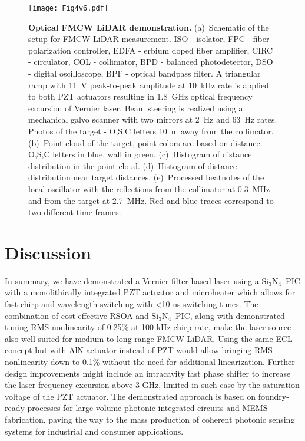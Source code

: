 \documentclass[9pt,twocolumn,twoside, superscriptaddress]{revtex4-2}
\newcommand{\SiN}[0]{Si$_3$N$_4$~}
\begin{document}
\begin{figure*}[t]
	\centering
	\footnotesize \linespread{1}
	\texttt{[image: Fig4v6.pdf]}
	\caption{
		\textbf{Optical FMCW LiDAR demonstration.}
		(a)~Schematic of the setup for FMCW LiDAR measurement. ISO - isolator, FPC - fiber polarization controller, EDFA - erbium doped fiber amplifier, CIRC - circulator, COL - collimator, BPD - balanced photodetector, DSO - digital oscilloscope, BPF - optical bandpass filter. 
		A triangular ramp with 11~V peak-to-peak amplitude at 10~kHz rate is applied to both PZT actuators resulting in 1.8~GHz optical frequency excursion of Vernier laser.
		Beam steering is realized using a mechanical galvo scanner with two mirrors at 2~Hz and 63~Hz rates.
		Photos of the target - O,S,C letters 10~m away from the collimator.
		(b)~Point cloud of the target, point colors are based on distance. O,S,C letters in blue, wall in green.
		(c)~Histogram of distance distribution in the point cloud.
		(d)~Histogram of distance distribution near target distances.
		(e)~Processed beatnotes of the local oscillator with the reflections from the collimator at 0.3~MHz and from the target at 2.7~MHz. Red and blue traces correspond to two different time frames. 
	}
	\label{Fig:Fig5}
\end{figure*}

\section{Discussion}
In summary, we have demonstrated a Vernier-filter-based laser using a \SiN PIC with a monolithically integrated PZT actuator and microheater which allows for fast chirp and wavelength switching with <10 ns switching times. 
The combination of cost-effective RSOA and \SiN PIC, along with demonstrated tuning RMS nonlinearity of 0.25\% at 100 kHz chirp rate, make the laser source also well suited for medium to long-range FMCW LiDAR.
Using the same ECL concept but with AlN actuator instead of PZT would allow bringing RMS nonlinearity down to 0.1\% without the need for additional linearization.
Further design improvements might include an intracavity fast phase shifter to increase the laser frequency excursion above 3 GHz, limited in such case by the saturation voltage of the PZT actuator.
The demonstrated approach is based on foundry-ready processes for large-volume photonic integrated circuits and MEMS fabrication, paving the way to the mass production of coherent photonic sensing systems for industrial and consumer applications.
\end{document}
